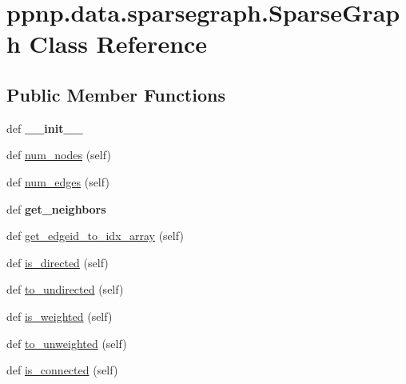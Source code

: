 \hypertarget{classppnp_1_1data_1_1sparsegraph_1_1SparseGraph}{}\section{ppnp.\+data.\+sparsegraph.\+Sparse\+Graph Class Reference}
\label{classppnp_1_1data_1_1sparsegraph_1_1SparseGraph}
\subsection*{Public Member Functions}
\begin{DoxyCompactItemize}
\item 
\mbox{\label{classppnp_1_1data_1_1sparsegraph_1_1SparseGraph_a8dcdecd7b58e5ab68b39d94cfaa6402a}} 
def {\bfseries \+\_\+\+\_\+init\+\_\+\+\_\+}
\item 
def \mbox{\hyperlink{classppnp_1_1data_1_1sparsegraph_1_1SparseGraph_a31dbd0918ae22ff10fe25a67b50d48db}{num\+\_\+nodes}} (self)
\item 
def \mbox{\hyperlink{classppnp_1_1data_1_1sparsegraph_1_1SparseGraph_aa2fd9dcc93eb10b66589e09ca705a8d5}{num\+\_\+edges}} (self)
\item 
\mbox{\label{classppnp_1_1data_1_1sparsegraph_1_1SparseGraph_ab2ec7be752921522753134d575275718}} 
def {\bfseries get\+\_\+neighbors}
\item 
def \mbox{\hyperlink{classppnp_1_1data_1_1sparsegraph_1_1SparseGraph_a6956c8f43642f31d76ccf5863572cab8}{get\+\_\+edgeid\+\_\+to\+\_\+idx\+\_\+array}} (self)
\item 
def \mbox{\hyperlink{classppnp_1_1data_1_1sparsegraph_1_1SparseGraph_a3d8a060f384b201d500c3ac5721924cf}{is\+\_\+directed}} (self)
\item 
def \mbox{\hyperlink{classppnp_1_1data_1_1sparsegraph_1_1SparseGraph_a5abd99db4591e9a156f59621802957ec}{to\+\_\+undirected}} (self)
\item 
def \mbox{\hyperlink{classppnp_1_1data_1_1sparsegraph_1_1SparseGraph_a85c07556b5f4f1a43c92d52b4f74a81d}{is\+\_\+weighted}} (self)
\item 
def \mbox{\hyperlink{classppnp_1_1data_1_1sparsegraph_1_1SparseGraph_a5b442d53f41dc373703f39ed1c4a39f4}{to\+\_\+unweighted}} (self)
\item 
def \mbox{\hyperlink{classppnp_1_1data_1_1sparsegraph_1_1SparseGraph_a2d6561d1ca1fab1d36c7ff7052475064}{is\+\_\+connected}} (self)

\end{DoxyCompactItemize}
